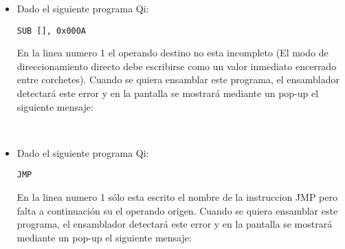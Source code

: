 \begin{itemize}
" \\

\item Dado el siguiente programa Qi:

\begin{verbatim}
SUB [], 0x000A
\end{verbatim}

En la linea numero 1 el operando destino no esta incompleto (El modo de direccionamiento directo debe escribirse como un valor inmediato encerrado entre corchetes). Cuando se quiera ensamblar este programa, el ensamblador detectará este error y en la pantalla se mostrará mediante un pop-up el siguiente mensaje:

 \\

\item Dado el siguiente programa Qi:

\begin{verbatim}
JMP
\end{verbatim}

En la linea numero 1 sólo esta escrito el nombre de la instruccion JMP pero falta a continuación su el operando origen. Cuando se quiera ensamblar este programa, el ensamblador detectará este error y en la pantalla se mostrará mediante un pop-up el siguiente mensaje:

 \\
 

\end{itemize}